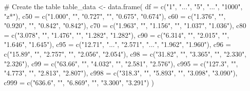 \documentclass[
  letterpaper,
  DIV=11,
  numbers=noendperiod]{scrreprt}
\newenvironment{Shaded}{\begin{snugshade}}{\end{snugshade}}
\newcommand{\AttributeTok}[1]{\textcolor[rgb]{0.40,0.45,0.13}{#1}}
\newcommand{\CommentTok}[1]{\textcolor[rgb]{0.37,0.37,0.37}{#1}}
\newcommand{\FunctionTok}[1]{\textcolor[rgb]{0.28,0.35,0.67}{#1}}
\newcommand{\NormalTok}[1]{\textcolor[rgb]{0.00,0.23,0.31}{#1}}
\newcommand{\OtherTok}[1]{\textcolor[rgb]{0.00,0.23,0.31}{#1}}
\newcommand{\StringTok}[1]{\textcolor[rgb]{0.13,0.47,0.30}{#1}}
\begin{document}
\begin{Shaded}
\begin{Highlighting}[]
\CommentTok{\# Create the table}
\NormalTok{table\_data }\OtherTok{\textless{}{-}} \FunctionTok{data.frame}\NormalTok{(}
  \AttributeTok{df =} \FunctionTok{c}\NormalTok{(}\StringTok{"1"}\NormalTok{, }\StringTok{"..."}\NormalTok{, }\StringTok{"5"}\NormalTok{, }\StringTok{"..."}\NormalTok{, }\StringTok{"1000"}\NormalTok{, }\StringTok{"z*"}\NormalTok{),}
  \AttributeTok{c50 =} \FunctionTok{c}\NormalTok{(}\StringTok{"1.000"}\NormalTok{, }\StringTok{""}\NormalTok{, }\StringTok{"0.727"}\NormalTok{, }\StringTok{""}\NormalTok{, }\StringTok{"0.675"}\NormalTok{, }\StringTok{"0.674"}\NormalTok{),}
  \AttributeTok{c60 =} \FunctionTok{c}\NormalTok{(}\StringTok{"1.376"}\NormalTok{, }\StringTok{""}\NormalTok{, }\StringTok{"0.920"}\NormalTok{, }\StringTok{""}\NormalTok{, }\StringTok{"0.842"}\NormalTok{, }\StringTok{"0.842"}\NormalTok{),}
  \AttributeTok{c70 =} \FunctionTok{c}\NormalTok{(}\StringTok{"1.963"}\NormalTok{, }\StringTok{""}\NormalTok{, }\StringTok{"1.156"}\NormalTok{, }\StringTok{""}\NormalTok{, }\StringTok{"1.037"}\NormalTok{, }\StringTok{"1.036"}\NormalTok{),}
  \AttributeTok{c80 =} \FunctionTok{c}\NormalTok{(}\StringTok{"3.078"}\NormalTok{, }\StringTok{""}\NormalTok{, }\StringTok{"1.476"}\NormalTok{, }\StringTok{""}\NormalTok{, }\StringTok{"1.282"}\NormalTok{, }\StringTok{"1.282"}\NormalTok{),}
  \AttributeTok{c90 =} \FunctionTok{c}\NormalTok{(}\StringTok{"6.314"}\NormalTok{, }\StringTok{""}\NormalTok{, }\StringTok{"2.015"}\NormalTok{, }\StringTok{""}\NormalTok{, }\StringTok{"1.646"}\NormalTok{, }\StringTok{"1.645"}\NormalTok{),}
  \AttributeTok{c95 =} \FunctionTok{c}\NormalTok{(}\StringTok{"12.71"}\NormalTok{, }\StringTok{"..."}\NormalTok{, }\StringTok{"2.571"}\NormalTok{, }\StringTok{"..."}\NormalTok{, }\StringTok{"1.962"}\NormalTok{, }\StringTok{"1.960"}\NormalTok{),}
  \AttributeTok{c96 =} \FunctionTok{c}\NormalTok{(}\StringTok{"15.89"}\NormalTok{, }\StringTok{""}\NormalTok{, }\StringTok{"2.757"}\NormalTok{, }\StringTok{""}\NormalTok{, }\StringTok{"2.056"}\NormalTok{, }\StringTok{"2.054"}\NormalTok{),}
  \AttributeTok{c98 =} \FunctionTok{c}\NormalTok{(}\StringTok{"31.82"}\NormalTok{, }\StringTok{""}\NormalTok{, }\StringTok{"3.365"}\NormalTok{, }\StringTok{""}\NormalTok{, }\StringTok{"2.330"}\NormalTok{, }\StringTok{"2.326"}\NormalTok{),}
  \AttributeTok{c99 =} \FunctionTok{c}\NormalTok{(}\StringTok{"63.66"}\NormalTok{, }\StringTok{""}\NormalTok{, }\StringTok{"4.032"}\NormalTok{, }\StringTok{""}\NormalTok{, }\StringTok{"2.581"}\NormalTok{, }\StringTok{"2.576"}\NormalTok{),}
  \AttributeTok{c995 =} \FunctionTok{c}\NormalTok{(}\StringTok{"127.3"}\NormalTok{, }\StringTok{""}\NormalTok{, }\StringTok{"4.773"}\NormalTok{, }\StringTok{""}\NormalTok{, }\StringTok{"2.813"}\NormalTok{, }\StringTok{"2.807"}\NormalTok{),}
  \AttributeTok{c998 =} \FunctionTok{c}\NormalTok{(}\StringTok{"318.3"}\NormalTok{, }\StringTok{""}\NormalTok{, }\StringTok{"5.893"}\NormalTok{, }\StringTok{""}\NormalTok{, }\StringTok{"3.098"}\NormalTok{, }\StringTok{"3.090"}\NormalTok{),}
  \AttributeTok{c999 =} \FunctionTok{c}\NormalTok{(}\StringTok{"636.6"}\NormalTok{, }\StringTok{""}\NormalTok{, }\StringTok{"6.869"}\NormalTok{, }\StringTok{""}\NormalTok{, }\StringTok{"3.300"}\NormalTok{, }\StringTok{"3.291"}\NormalTok{)}
\NormalTok{)}


\end{Highlighting}
\end{Shaded}
\end{document}
